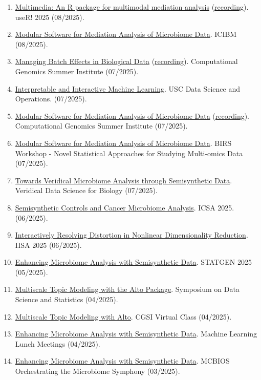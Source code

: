 \documentclass[letterpaper]{article}
\begin{document}
\begin{enumerate}
  \item \href{https://go.wisc.edu/padl48}{Multimedia: An R package for multimodal mediation analysis} (\href{https://www.youtube.com/watch?v=I5TVpPiQKYw}{recording}). useR! 2025 (08/2025).
  \item \href{https://go.wisc.edu/pb531s}{Modular Software for Mediation Analysis of Microbiome Data}. ICIBM (08/2025).
  \item \href{https://go.wisc.edu/qjn8us}{Managing Batch Effects in Biological Data} (\href{https://www.youtube.com/watch?v=tRf-SXe5TuQ&t=318s}{recording}). Computational Genomics Summer Institute (07/2025).
  \item \href{https://go.wisc.edu/vzhdt1}{Interpretable and Interactive Machine Learning}. USC Data Science and Operations. (07/2025).
  \item \href{https://go.wisc.edu/a9k4zo}{Modular Software for Mediation Analysis of Microbiome Data} (\href{https://www.youtube.com/watch?v=Xq8Kh84rWMM}{recording}). Computational Genomics Summer Institute (07/2025).
  \item \href{https://go.wisc.edu/5ms623}{Modular Software for Mediation Analysis of Microbiome Data}. BIRS Workshop - Novel Statistical Approaches for Studying Multi-omics Data (07/2025).
  \item \href{https://go.wisc.edu/5q8xvl}{Towards Veridical Microbiome Analysis through Semisynthetic Data}. Veridical Data Science for Biology (07/2025).
  \item \href{https://gowisc.edu/02hl09}{Semisynthetic Controls and Cancer Microbiome Analysis}. ICSA 2025. (06/2025).
  \item \href{https://go.wisc.edu/y74jh3}{Interactively Resolving Distortion in Nonlinear Dimensionality Reduction}. IISA 2025 (06/2025).
  \item \href{https://go.wisc.edu/46xtw9}{Enhancing Microbiome Analysis with Semisynthetic Data}. STATGEN 2025 (05/2025).
  \item \href{https://go.wisc.edu/9q5ls4}{Multiscale Topic Modeling with the Alto Package}. Symposium on Data Science and Statistics (04/2025).
  \item \href{https://go.wisc.edu/54f161}{Multiscale Topic Modeling with Alto}. CGSI Virtual Class (04/2025).
  \item \href{https://go.wisc.edu/z3tx91}{Enhancing Microbiome Analysis with Semisynthetic Data}. Machine Learning Lunch Meetings (04/2025).
  \item \href{https://go.wisc.edu/46xtw9}{Enhancing Microbiome Analysis with Semisynthetic Data}. MCBIOS Orchestrating the Microbiome Symphony (03/2025).

\end{enumerate}
\end{document}
